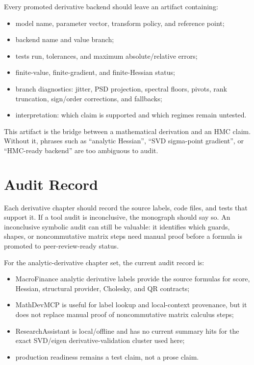 Every promoted derivative backend should leave an artifact containing:
\begin{itemize}
  \item model name, parameter vector, transform policy, and reference point;
  \item backend name and value branch;
  \item tests run, tolerances, and maximum absolute/relative errors;
  \item finite-value, finite-gradient, and finite-Hessian status;
  \item branch diagnostics: jitter, PSD projection, spectral floors, pivots,
    rank truncation, sign/order corrections, and fallbacks;
  \item interpretation: which claim is supported and which regimes remain
    untested.
\end{itemize}
This artifact is the bridge between a mathematical derivation and an HMC claim.
Without it, phrases such as ``analytic Hessian'', ``SVD sigma-point gradient'',
or ``HMC-ready backend'' are too ambiguous to audit.

\section{Audit Record}
\label{sec:bf-derivative-audit-record}

Each derivative chapter should record the source labels, code files, and tests
that support it.  If a tool audit is inconclusive, the monograph should say so.
An inconclusive symbolic audit can still be valuable: it identifies which
guards, shapes, or noncommutative matrix steps need manual proof before a
formula is promoted to peer-review-ready status.

For the analytic-derivative chapter set, the current audit record is:
\begin{itemize}
  \item MacroFinance analytic derivative labels provide the source formulas for
    score, Hessian, structural provider, Cholesky, and QR contracts;
  \item MathDevMCP is useful for label lookup and local-context provenance, but
    it does not replace manual proof of noncommutative matrix calculus steps;
  \item ResearchAssistant is local/offline and has no current summary hits for
    the exact SVD/eigen derivative-validation cluster used here;
  \item production readiness remains a test claim, not a prose claim.
\end{itemize}
